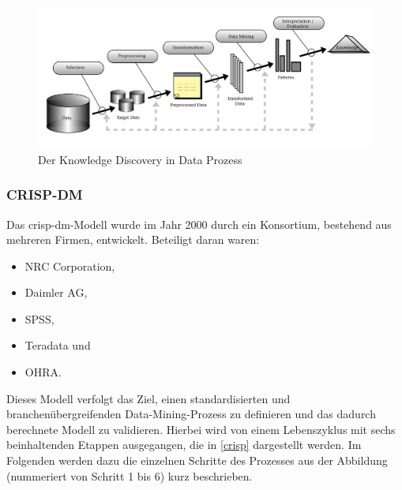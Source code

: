 \begin{figure}[H]
\centering
\includegraphics[scale=0.85]{se-wa-jpg/kdd}
\caption[Der Knowledge Discovery in Data Prozess]{Der Knowledge Discovery in Data Prozess\protect\footnotemark}
\label{kddpic}
\end{figure}


\subsubsection{CRISP-DM}
Das \gls{crisp-dm}-Modell wurde im Jahr 2000 durch ein Konsortium, bestehend aus mehreren Firmen, entwickelt. Beteiligt daran waren:

\begin{itemize}
\item NRC Corporation,
\item Daimler AG,
\item SPSS,
\item Teradata und
\item OHRA.
\end{itemize}

Dieses Modell verfolgt das Ziel, einen standardisierten und branchenübergreifenden Data-Mining-Prozess zu definieren und das dadurch berechnete Modell zu validieren. Hierbei wird von einem Lebenszyklus mit sechs beinhaltenden Etappen ausgegangen, die in \vref{crisp} dargestellt werden. Im Folgenden werden dazu die einzelnen Schritte des Prozesses aus der Abbildung (nummeriert von Schritt 1 bis 6) kurz beschrieben.

